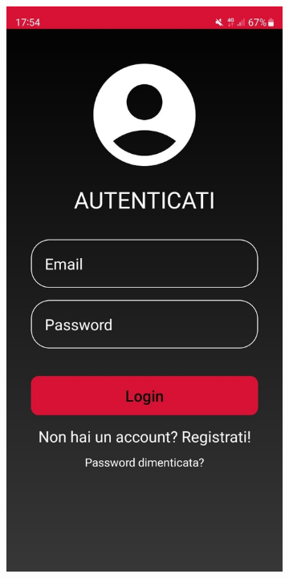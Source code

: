\begin{figure}[ht]
    \centering
    \begin{subfigure}[b]{0.3\textwidth}
      \includegraphics[width=\textwidth, height=0.45\textheight]{Immagini/App/login_scuro.jpeg}

\end{subfigure}
\end{figure}
